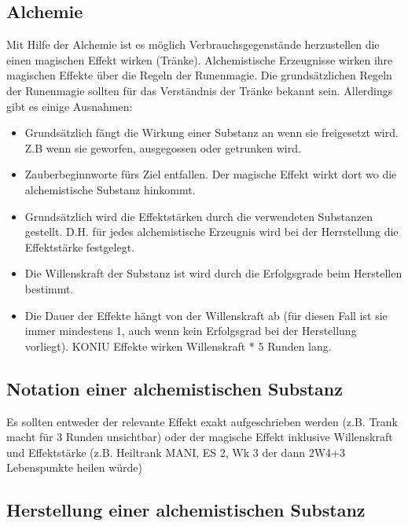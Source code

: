 \documentclass{article}
\begin{document}
\newpage

\begin{center}
\section{Alchemie}
\end{center}

Mit Hilfe der Alchemie ist es möglich Verbrauchsgegenstände herzustellen die einen magischen Effekt wirken (Tränke).
Alchemistische Erzeugnisse wirken ihre magischen Effekte über die Regeln der Runenmagie. Die grundsätzlichen Regeln
der Runenmagie sollten für das Verständnis der Tränke bekannt sein. Allerdings gibt es einige Ausnahmen:

\begin{itemize}
\item Grundsätzlich fängt die Wirkung einer Substanz an wenn sie freigesetzt wird. Z.B wenn sie geworfen, ausgegossen oder getrunken wird.
\item Zauberbeginnworte fürs Ziel entfallen. Der magische Effekt wirkt dort wo die alchemistische Substanz hinkommt.
\item Grundsätzlich wird die Effektstärken durch die verwendeten Substanzen gestellt. D.H. für jedes alchemistische Erzeugnis wird bei der Herrstellung die Effektstärke festgelegt.
\item Die Willenskraft der Substanz ist wird durch die Erfolgsgrade beim Herstellen bestimmt.
\item Die Dauer der Effekte hängt von der Willenskraft ab (für diesen Fall ist sie immer mindestens 1, auch wenn kein Erfolgsgrad bei der Herstellung vorliegt). KONIU Effekte wirken Willenskraft * 5 Runden lang.
\end{itemize}

\begin{center}
\subsection{Notation einer alchemistischen Substanz}
\end{center}

Es sollten entweder der relevante Effekt exakt aufgeschrieben werden (z.B. Trank macht für 3 Runden unsichtbar) oder
der magische Effekt inklusive Willenskraft und Effektstärke (z.B. Heiltrank MANI, ES 2, Wk 3 der dann 2W4+3
Lebenspunkte heilen würde)

\begin{center}
\subsection{Herstellung einer alchemistischen Substanz}
\end{center}
\end{document}
